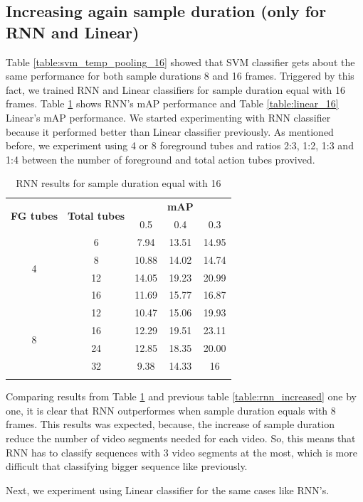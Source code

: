 \documentclass{report}
\begin{document}
\subsection{Increasing again sample duration (only for RNN and Linear)}

Table \ref{table:svm_temp_pooling_16} showed that SVM classifier gets about the same performance for both sample durations 8 and 16 frames.
Triggered by this fact, we trained RNN and Linear classifiers for sample duration equal with 16 frames. Table \ref{table:rnn_16} shows RNN's mAP
performance and Table \ref{table:linear_16} Linear's mAP performance. We started experimenting with RNN classifier because it performed better than
Linear classifier previously. As mentioned before, we experiment using 4 or 8 foreground tubes and ratios 2:3, 1:2, 1:3 and 1:4 between the number of
foreground and total action tubes provived.

\begin{center}
  \begin{longtable}{|| c | c || c c c ||}
    \hline
    \multirow{2}{*}{\textbf{FG tubes}} & \multirow{2}{*}{\textbf{Total tubes}} & {} & \textbf{mAP} & {} \\
    {} & {} & 0.5 & 0.4 & 0.3 \\
    \hline
    \multirow{4}{*}{4} & 6 & 7.94 & 13.51 & 14.95 \\
    \cline{2-5}
    {} & 8 & 10.88 & 14.02 & 14.74  \\
    \cline{2-5}
    {} & 12 & 14.05 & 19.23 & 20.99 \\
    \cline{2-5}
    {} & 16 & 11.69 & 15.77 & 16.87  \\
    \hline
    \multirow{4}{*}{8} & 12 & 10.47 & 15.06 & 19.93 \\
    \cline{2-5}
    {} & 16 &  12.29 & 19.51 & 23.11  \\
    \cline{2-5}
    {} & 24 & 12.85 & 18.35 & 20.00 \\
    \cline{2-5}
    {} & 32 & 9.38 & 14.33 & 16 \\
    \hline

  \caption{RNN results for sample duration equal with 16}
  \label{table:rnn_16}
\end{longtable}
\end{center}

Comparing results from Table \ref{table:rnn_16} and previous table \ref{table:rnn_increased} one by one, it is clear that RNN outperformes when sample
duration equals with 8 frames. This results was expected, because, the increase of sample duration reduce the number of video segments needed for each video.
So, this means that RNN has to classify sequences with 3 video segments at the most, which is more difficult that classifying bigger sequence like previously. \par
Next, we experiment using Linear classifier for the same cases like RNN's. 
\end{document}
